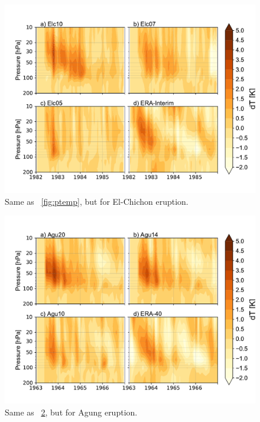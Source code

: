 \documentclass[acpd, hvmath, online]{copernicus_discussions}
\begin{document}
\newpage
\begin{figure}[ht!]
\includegraphics[width=.8\textwidth,height=.6\textheight,trim={0.1cm 0.1cm 0.1cm 0.1cm},clip]{Elchichon_dt.pdf}
\caption{Same as ~\ref{fig:ptemp}, but for El-Chichon eruption.} 
\label{fig:etemp}
\end{figure}



\newpage
\begin{figure}[ht!]
\includegraphics[width=.8\textwidth,height=.6\textheight,trim={0.1cm 0.1cm 0.1cm 0.1cm},clip]{Agung_dt.pdf}
\caption{Same as ~\ref{fig:atemp}, but for Agung eruption.} 
\label{fig:atemp}
\end{figure}
\end{document}
